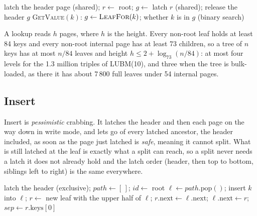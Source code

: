 \documentclass[sigconf, nonacm]{acmart}
\begin{document}
\begin{algorithm}[t]
\caption{\textsc{LeafFor}$(k)$ and \textsc{GetValue}$(k)$}\label{alg:search}
\small
latch the header page (shared); $r \gets$ root; 
$g \gets$ latch $r$ (shared); release the header\;
\Return $g$\;
\medskip
\textsc{GetValue}$(k)$: $g \gets \textsc{LeafFor}(k)$; \Return whether $k$ is in $g$ (binary search)\;
\end{algorithm}

A lookup reads $h$ pages, where $h$ is the height. Every non-root leaf holds at least 84 keys and every non-root internal page has at least 73 children, so a tree of $n$ keys has at most $n/84$ leaves and height $h \le 2 + \log_{73}(n/84)$: at most four levels for the 1.3 million triples of LUBM(10), and three when the tree is bulk-loaded, as there it has about 7\,800 full leaves under 54 internal pages.

\subsection{Insert}

Insert is \emph{pessimistic} crabbing. It latches the header and then each page on the way down in write mode, and lets go of every latched ancestor, the header included, as soon as the page just latched is \emph{safe}, meaning it cannot split. What is still latched at the leaf is exactly what a split can reach, so a split never needs a latch it does not already hold and the latch order (header, then top to bottom, siblings left to right) is the same everywhere.

\begin{algorithm}[t]
\caption{\textsc{Insert}$(k)$}\label{alg:insert}
\small
latch the header (exclusive); 
$\mathit{path} \gets [\,]$; $id \gets$ root\;
$\ell \gets \mathit{path}.\text{pop}()$; 
insert $k$ into $\ell$; 
$r \gets$ new leaf with the upper half of $\ell$; $r.\text{next} \gets \ell.\text{next}$; $\ell.\text{next} \gets r$; $\mathit{sep} \gets r.\text{keys}[0]$\;
\end{algorithm}
\end{document}
